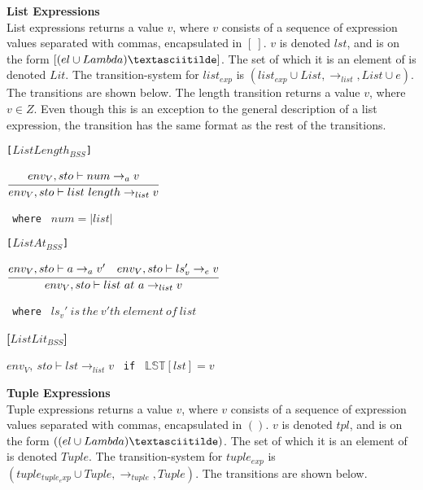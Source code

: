 \textbf{\Large{List Expressions}}\\
List expressions returns a value $v$, where $v$ consists of a sequence of expression values separated with commas, encapsulated in $[\ ]$.
$v$ is denoted $lst$, and is on the form $[(el \cup Lambda)\textasciitilde]$.
The set of which it is an element of is denoted $Lit$.
The transition-system for $list_{exp}$ is $(list_{exp} \cup List, \rightarrow_{list}, List \cup e)$.
The transitions are shown below.
The length transition returns a value $v$, where $v \in Z$.
Even though this is an exception to the general description of a list expression, the transition has the same format as the rest of the transitions.

\texttt{[$ListLength_{BSS}$]}\\
\begin{center}
	\begin{math}
		\cfrac
			{env_V, sto \vdash num \rightarrow_{a} v}
			{env_V, sto \vdash list\ length \rightarrow_{list} v}
	\end{math}
	
	\texttt{ where } $num = |list|$
\end{center}

\texttt{[$ListAt_{BSS}$]}\\
\begin{center}
	\begin{math}
		\cfrac
			{env_V, sto \vdash a \rightarrow_{a} v' \quad env_V, sto \vdash ls_v' \rightarrow_e v}
			{env_V, sto \vdash list\ at\ a \rightarrow_{list} v}
	\end{math}
	
	\texttt{ where } $ls_v'\ is\ the\ v'th\ element\ of\ list$
\end{center}

\textbf{[$ListLit_{BSS}$]}\\
\begin{center}
	\begin{math}
	env_V,\ sto \vdash lst \rightarrow_{list} v
	\end{math}
	\texttt{ if } $\mathbb{LST}[lst] = v$
\end{center}

\textbf{\Large{Tuple Expressions}}\\
Tuple expressions returns a value $v$, where $v$ consists of a sequence of expression values separated with commas, encapsulated in $()$.
$v$ is denoted $tpl$, and is on the form $((el \cup Lambda)\textasciitilde)$.
The set of which it is an element of is denoted $Tuple$.
The transition-system for $tuple_{exp}$ is $(tuple_{tuple_exp} \cup Tuple, \rightarrow_{tuple}, Tuple)$.
The transitions are shown below.

